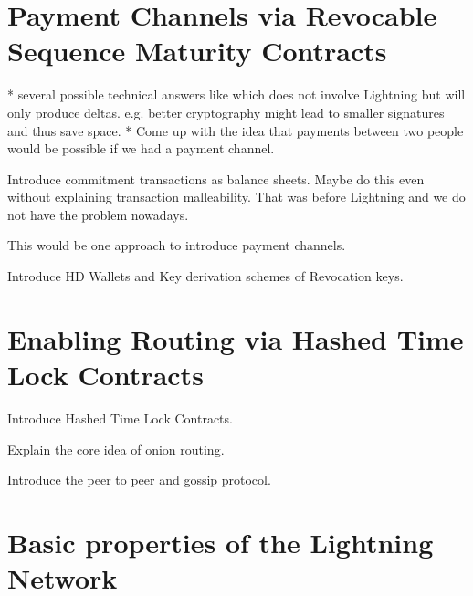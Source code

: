 \documentclass[a4paper,12pt,oneside,openany]{book}
\begin{document}
\section{Payment Channels via Revocable Sequence Maturity Contracts}


* several possible technical answers like which does not involve Lightning but will only produce deltas. e.g. better cryptography might lead to smaller signatures and thus save space.
* Come up with the idea that payments between two people would be possible if we had a payment channel.


Introduce commitment transactions as balance sheets.
Maybe do this even without explaining transaction malleability. That was before Lightning and we do not have the problem nowadays.

This would be one approach to introduce payment channels.

Introduce HD Wallets and Key derivation schemes of Revocation keys.

\section{Enabling Routing via Hashed Time Lock Contracts}
Introduce Hashed Time Lock Contracts.

Explain the core idea of onion routing.

Introduce the peer to peer and gossip protocol.

\section{Basic properties of the Lightning Network}
\end{document}
